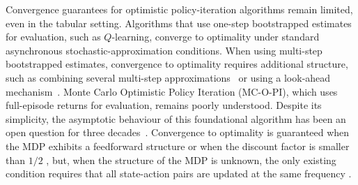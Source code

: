 % 


Convergence guarantees for optimistic policy-iteration algorithms remain limited, even in the tabular setting.
Algorithms that use one-step bootstrapped estimates for evaluation, such as $Q$-learning, converge to optimality under standard asynchronous stochastic-approximation conditions.
When using multi-step bootstrapped estimates, convergence to optimality requires additional structure, such as combining several multi-step approximations~\citep{Harutyunyan2016QCorrections, Munos2016SafeLearning} or using a look-ahead mechanism~\citep{Winnicki2023OnEvaluation}.
Monte Carlo Optimistic Policy Iteration (MC-O-PI), which uses full-episode returns for evaluation, remains poorly understood. Despite its simplicity, the asymptotic behaviour of this foundational algorithm has been an open question for three decades~\citep{Sutton1999OpenLearning}.
Convergence to optimality is guaranteed when the MDP exhibits a feedforward structure \citep{Wang2022OnLearning, Lubars2021OptimisticStructure}
or when the discount factor is smaller than $1/2$ \citep{Delattre2025MarkovAlgorithm},
but, when the structure of the MDP is unknown, the only existing condition requires that all state-action pairs are updated at the same frequency \citep{Tsitsiklis2002OnIteration, Chen2018OnProblem, Liu2021OnStarts}.


